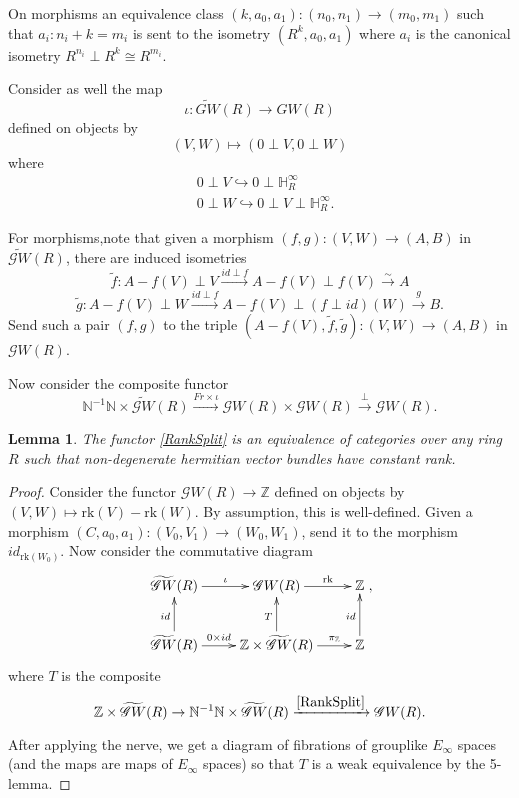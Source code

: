 \documentclass[draftthesis,tocnosub,noragright,centerchapter,10pt]{uiucthesis2009}
\newcommand{\Z}{\mathbb Z}
\newcommand{\mbb}{\mathbb}
\theoremstyle{plain}
\newtheorem{lemma}{Lemma}
\theoremstyle{definition}
\begin{document}
On morphisms an equivalence class $(k,a_0,a_1) : (n_0,n_1) \rightarrow
(m_0,m_1)$ such that $a_i : n_i + k = m_i$ is sent to the isometry
$(R^k,a_0,a_1)$ where  $a_i$ is the canonical isometry  $R^{n_i} \perp R^k \cong R^{m_i}$.

Consider as well the map 
\[
\iota: \widetilde{GW}(R) \rightarrow GW(R)
\]
 defined
on objects by
\[
(V,W) \mapsto (0 \perp V,0 \perp W)
\]
where
\begin{align*}
&0 \perp V \hookrightarrow 0 \perp \mbb H^\infty_R \\
&0 \perp W \hookrightarrow 0 \perp
V \perp \mbb H^\infty_R.
\end{align*}

For morphisms,note that given a morphism $(f,g) : (V,W) \rightarrow
(A,B)$ in $\widetilde{\mathscr GW}(R)$, there are induced isometries
\[
\widetilde{f} : A-f(V) \perp V \xrightarrow{id \perp f} A-f(V) \perp
f(V) \xrightarrow{\sim} A
\]
\[
\widetilde{g} : A-f(V) \perp W \xrightarrow{id \perp f} A-f(V) \perp (f \perp id)(W)
\xrightarrow{g} B.
\]  
Send such a pair $(f,g)$ to the triple $(A-f(V),\widetilde f,
\widetilde g) : (V,W) \rightarrow (A,B)$ in $\mathscr GW(R)$.


Now consider the composite functor
\begin{equation}\label{RankSplit}
\mbb N^{-1} \mbb N \times \widetilde{\mathscr GW}(R) \xrightarrow{Fr
  \times \iota}\mathscr GW(R) \times \mathscr GW(R)
\xrightarrow{\perp} \mathscr GW(R).
\end{equation}

\begin{lemma}
The functor \eqref{RankSplit} is an equivalence of categories over any
ring $R$ such that non-degenerate hermitian vector bundles have
constant rank. 
\end{lemma}

\begin{proof}
Consider the functor $\mathscr GW(R) \rightarrow \Z$
defined on objects by $(V,W) \mapsto
\mathrm{rk}(V)-\mathrm{rk}(W)$. By assumption, this is well-defined. Given a morphism $(C,a_0,a_1) :
(V_0,V_1) \rightarrow (W_0,W_1)$, send it to the morphism
$id_{\mathrm{rk}(W_0)}$. Now consider the commutative diagram
\[
\xymatrix{\widetilde{\mathscr GW}(R) \ar[r]^{\iota} & \mathscr GW(R)
\ar[r]^-{\mathrm{rk}} & \Z \\ \widetilde{\mathscr GW}(R) \ar[u]^{id}
\ar[r]^-{0 \times id} & \Z \times \widetilde{\mathscr GW}(R) \ar[u]^{T} \ar[r]^-{\pi_\Z} & \Z \ar[u]^{id}},
\]
where $T$ is the composite
\[
\Z \times \widetilde{\mathscr GW}(R) \rightarrow 
  \mbb N^{-1}\mbb N \times  \widetilde{\mathscr GW}(R)  \xrightarrow{\eqref{RankSplit}} \mathscr GW(R).
\]

After applying the nerve, we get a diagram of fibrations of grouplike $E_\infty$ spaces (and the
maps are maps of $E_\infty$ spaces) so that $T$ is a weak equivalence
by the 5-lemma. 
\end{proof}
\end{document}
